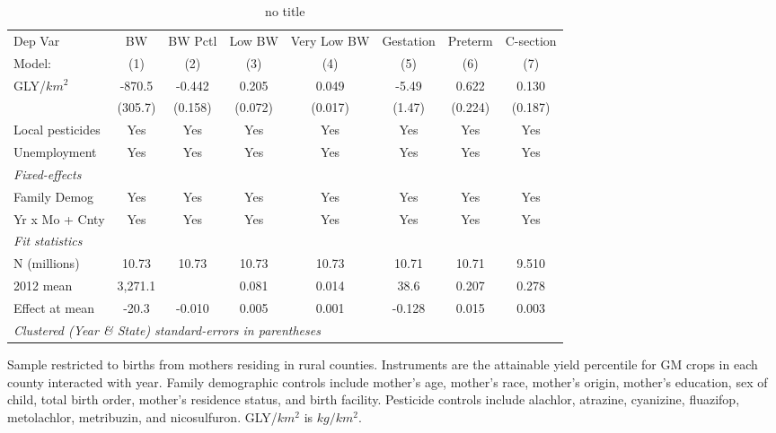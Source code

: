 \begin{table}[htbp]
   \centering
   \begin{threeparttable}[b]
      \caption{\label{tab:main-outcomes-ss} no title}
      \begin{tabular}{lccccccc}
         \toprule
         Dep Var          & BW      & BW Pctl & Low BW  & Very Low BW & Gestation & Preterm & C-section\\  
         Model:           & (1)     & (2)     & (3)     & (4)         & (5)       & (6)     & (7)\\  
         \midrule 
         GLY/$km^2$       & -870.5  & -0.442  & 0.205   & 0.049       & -5.49     & 0.622   & 0.130\\   
                          & (305.7) & (0.158) & (0.072) & (0.017)     & (1.47)    & (0.224) & (0.187)\\   
         Local pesticides & Yes     & Yes     & Yes     & Yes         & Yes       & Yes     & Yes\\  
         Unemployment     & Yes     & Yes     & Yes     & Yes         & Yes       & Yes     & Yes\\  
         \midrule
         \emph{Fixed-effects}\\
         Family Demog     & Yes     & Yes     & Yes     & Yes         & Yes       & Yes     & Yes\\  
         Yr x Mo + Cnty   & Yes     & Yes     & Yes     & Yes         & Yes       & Yes     & Yes\\  
         \midrule
         \emph{Fit statistics}\\
         N (millions)     & 10.73   & 10.73   & 10.73   & 10.73       & 10.71     & 10.71   & 9.510\\  
         2012 mean        & 3,271.1 &         & 0.081   & 0.014       & 38.6      & 0.207   & 0.278\\  
         Effect at mean   & -20.3   & -0.010  & 0.005   & 0.001       & -0.128    & 0.015   & 0.003\\  
         \midrule
         \multicolumn{8}{l}{\emph{Clustered (Year \& State) standard-errors in parentheses}}\\
      \end{tabular}
      
      \begin{tablenotes}\item Sample restricted to births from mothers residing in rural counties. Instruments are the attainable yield percentile for GM crops in each county interacted with year. Family demographic controls include mother's age, mother's race, mother's origin, mother's education, sex of child, total birth order, mother's residence status, and birth facility. Pesticide controls include alachlor, atrazine, cyanizine, fluazifop, metolachlor, metribuzin, and nicosulfuron. GLY/$km^2$ is $kg/km^2$.
      \end{tablenotes}
   \end{threeparttable}
\end{table}
